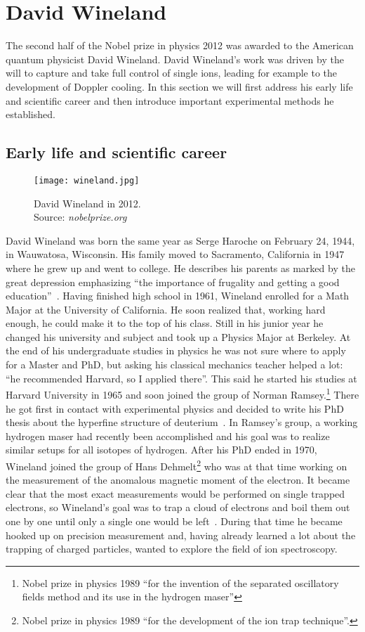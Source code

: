 \section{David Wineland}
\label{sec:Wineland}
The second half of the Nobel prize in physics 2012 was awarded to the American
quantum physicist David Wineland. David Wineland's work was driven by the will to
capture and take full control of single ions, leading for example to the
development of Doppler cooling. In this section we will first address
his early life and scientific career and then introduce important experimental
methods he established.

\subsection{Early life and scientific career}
\begin{wrapfigure}{r}{0.34\textwidth}
  \centering
  \texttt{[image: wineland.jpg]}
  \caption{David Wineland in 2012.\\ Source: \textit{nobelprize.org}}
\end{wrapfigure}
David Wineland was born the same year as Serge Haroche on February 24, 1944,
in Wauwatosa, Wisconsin. His family moved to Sacramento, California in 1947
where he grew up and went to college. He describes his parents as marked by the
great depression emphasizing ``the importance of frugality and getting a good
education''~\cite{dwbio}. Having finished high school in 1961, Wineland enrolled
for a Math Major at the University of California. He soon realized that, working
hard enough, he could make it to the top of his class. Still in his junior year
he changed his university and subject and took up a Physics Major at Berkeley.
At the end of his undergraduate studies in physics he was not sure where to apply
for a Master and PhD, but asking his classical mechanics teacher helped a lot:
``he recommended Harvard, so I applied there''. This said he started his studies
at Harvard University in 1965 and soon joined the group of Norman Ramsey.\footnote{Nobel
prize in physics 1989 ``for the invention of the separated oscillatory fields
method and its use in the hydrogen maser''} 
There he got first in contact with experimental physics and decided to write his
PhD thesis about the hyperfine structure of deuterium~\cite{wineland1972atomic}.
In Ramsey's group, a working 
hydrogen maser had recently been accomplished and his goal was to realize similar
setups for all isotopes of hydrogen. After his PhD ended in  1970, Wineland
joined the group of Hans Dehmelt\footnote{Nobel prize in physics 1989 ``for the
development of the ion trap technique''.} who was at that time working on the
measurement of the anomalous magnetic moment of the electron. It became clear
that the most exact measurements would be performed on single trapped electrons,
so Wineland's goal was to trap a cloud of electrons and boil them out one by one
until only a single one would be left~\cite{wineland1973monoelectron}. During
that time he became hooked up on precision measurement and, having already
learned a lot about the trapping of charged particles, wanted to explore the
field of ion spectroscopy.

